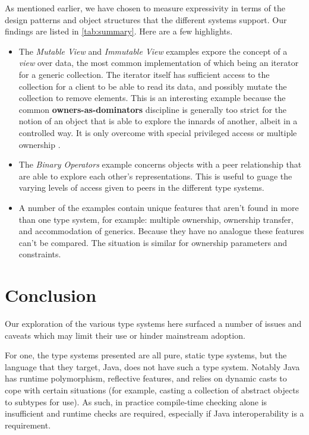 \documentclass{acm_proc_article-sp}
\begin{document}
As mentioned earlier, we have chosen to measure expressivity in terms of the
design patterns and object structures that the different systems support.
Our findings are listed in \cref{tab:summary}. Here are a few highlights.

\begin{itemize}

	\item The \textit{Mutable View} and \textit{Immutable View} examples expore
		the concept of a \textit{view} over data, the most common implementation
		of which being an iterator for a generic collection. The iterator itself
		has sufficient access to the collection for a client to be able to read
		its data, and possibly mutate the collection to remove elements. This is
		an interesting example because the common \textbf{owners-as-dominators}
		discipline is generally too strict for the notion of an object that is
		able to explore the innards of another, albeit in a controlled way. It
		is only overcome with special privileged access
		\cite{boyapati04safejava} or multiple ownership \cite{cameron07mojo}.

	\item The \textit{Binary Operators} example concerns objects with a peer
		\cite{dietl11gut} relationship that are able to explore each other's
		representations. This is useful to guage the varying levels of access
		given to peers in the different type systems.
	
	\item A number of the examples contain unique features that aren't found in
		more than one type system, for example: multiple ownership, ownership
		transfer, and accommodation of generics. Because they have no analogue
		these features can't be compared. The situation is similar for ownership
		parameters and constraints.

\end{itemize}

\section{Conclusion}
\label{sec:conclusion}

Our exploration of the various type systems here surfaced a number of issues and
caveats which may limit their use or hinder mainstream adoption.

For one, the type systems presented are all pure, static type systems, but the
language that they target, Java, does not have such a type system. Notably Java
has runtime polymorphism, reflective features, and relies on dynamic casts to
cope with certain situations (for example, casting a collection of abstract
objects to subtypes for use). As such, in practice compile-time checking alone
is insufficient \cite{boyapati04safejava} and runtime checks are required,
especially if Java interoperability is a requirement.
\end{document}
